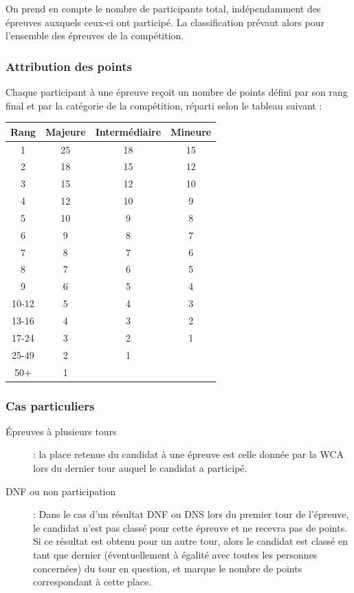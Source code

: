 \documentclass[10pt,a4paper]{article}
\newcommand{\3}{$3\times3$}
\newcommand{\4}{$4\times4$}
\newcommand{\2}{$2\times2$}
\begin{document}
On prend en compte le nombre de participants total, indépendamment des épreuves auxquels ceux-ci ont participé. La classification prévaut alors pour l'ensemble des épreuves de la compétition.

\subsubsection{Attribution des points}

Chaque participant à une épreuve reçoit un nombre de points défini par son rang final et par la catégorie de la compétition, réparti selon le tableau suivant :

\begin{table}[h]
\begin{center}
\begin{tabular}{|c|c|c|c|}
\hline
Rang & Majeure & Intermédiaire & Mineure \\
\hline
1 & 25 & 18 & 15 \\
2 & 18 & 15 & 12 \\
3 & 15 & 12 & 10 \\
4 & 12 & 10 & 9  \\
5 & 10 & 9  & 8  \\
6 & 9  & 8  & 7  \\
7 & 8  & 7  & 6  \\
8 & 7  & 6  & 5  \\
9 & 6  & 5  & 4  \\
10-12 & 5  & 4  & 3  \\
13-16 & 4  & 3  & 2  \\
17-24 & 3  & 2  & 1  \\
25-49 & 2  & 1  &    \\
50+   & 1  &    &    \\
\hline
\end{tabular}
\end{center}
\end{table}


\subsubsection{Cas particuliers}

\begin{description}
\item [Épreuves à plusieurs tours] : la place retenue du candidat à une épreuve est celle donnée par la WCA lors du dernier tour auquel le candidat a participé.
\item [DNF ou non participation] : Dans le cas d'un résultat DNF ou DNS lors du premier tour de l'épreuve, le candidat n'est pas classé pour cette épreuve et ne recevra pas de points. Si ce résultat est obtenu pour un autre tour, alors le candidat est classé en tant que dernier (éventuellement à égalité avec toutes les personnes concernées) du tour en question, et marque le nombre de points correspondant à cette place.
\end{description}
\end{document}
